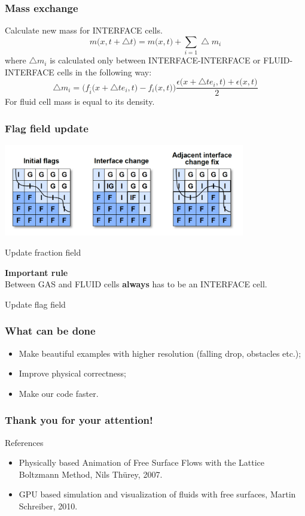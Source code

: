 \documentclass[10pt,a4paper]{beamer}
\DeclareRobustCommand{\mybox}[2][gray!20]{%
\begin{tcolorbox}[   %
        breakable,
        left=0pt,
        right=0pt,
        top=0pt,
        bottom=0pt,
        colback=#1,
        colframe=#1,
        width=\dimexpr\textwidth\relax, 
        enlarge left by=0mm,
        boxsep=5pt,
        arc=0pt,outer arc=0pt,
        ]
        #2
\end{tcolorbox}
}
\begin{document}
\begin{frame}
  \frametitle{Mass exchange}
  Calculate new mass for INTERFACE cells.
    \begin{equation}
      m\big(x, t+\bigtriangleup t\big) = m\big(x,t\big)+\sum_{i=1}\bigtriangleup m_i
    \end{equation}
    where $\bigtriangleup m_i$ is calculated only between INTERFACE-INTERFACE or
    FLUID-INTERFACE cells in the following way:
    \begin{equation}
      \bigtriangleup m_i = \Big(f_{\bar{i}}\big(x+\bigtriangleup te_i,t\big)-f_i\big(x,t\big)\Big)\frac{\epsilon\big(x+\bigtriangleup te_i,t\big)+\epsilon\big(x,t\big)}{2}
    \end{equation}
    For fluid cell mass is equal to its density.
\end{frame}

\begin{frame}
  \frametitle{Flag field update}
  \includegraphics[height=4cm]{interface}

  Update fraction field
  \mybox[green!20]{
    \textbf{Important rule}\\
    Between GAS and FLUID cells \textbf{always} has to be
    an INTERFACE cell.
  }
  Update flag field
\end{frame}
\begin{frame}
  \frametitle{What can be done}
  \begin{itemize}
  \item Make beautiful examples with higher resolution (falling drop, obstacles
    etc.);
    \item Improve physical correctness;
  \item Make our code faster.
  \end{itemize}
\end{frame}

\begin{frame}
\frametitle{Thank you for your attention!}
\end{frame}


\begin{frame}
  References
  \begin{itemize}
  \item Physically based Animation of Free Surface Flows with the Lattice
    Boltzmann Method, Nils Thürey, 2007.
  \item GPU based simulation and visualization of fluids with free surfaces, Martin Schreiber, 2010.
  \end{itemize}
\end{frame}
\end{document}
